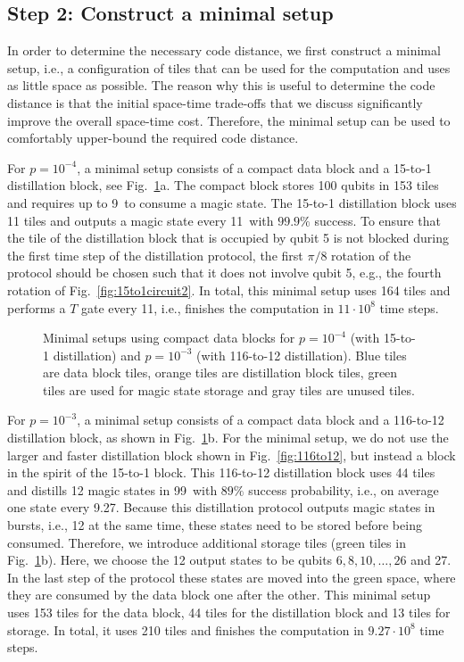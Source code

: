\documentclass[prx,aps,letterpaper,twocolumn,allowfontchageintitle=true,accepted=2019-02-01]{quantumarticle}
\begin{document}
\subsection{Step 2: Construct a minimal setup}

In order to determine the necessary code distance, we first construct a minimal setup, i.e., a configuration of tiles that can be used for the computation and uses as little space as possible. The reason why this is useful to determine the code distance is that the initial space-time trade-offs that we discuss significantly improve the overall space-time cost. Therefore, the minimal setup can be used to comfortably upper-bound the required code distance.

For $p=10^{-4}$, a minimal setup consists of a compact data block and a 15-to-1 distillation block, see Fig.~\ref{fig:minimalsetup1}a. The compact block stores 100 qubits in 153 tiles and requires up to 9\clock \ to consume a magic state. The 15-to-1 distillation block uses 11 tiles and outputs a magic state every 11\clock \ with $99.9\%$ success. To ensure that the tile of the distillation block that is occupied by qubit 5 is not blocked during the first time step of the distillation protocol, the first $\pi/8$ rotation of the protocol should be chosen such that it does not involve qubit 5, e.g., the fourth rotation of Fig.~\ref{fig:15to1circuit2}. In total, this minimal setup uses 164 tiles and performs a $T$ gate every 11\clock, i.e., finishes the computation in $11 \cdot 10^8$ time steps.


\begin{figure}[t!]
\centering
\def\svgwidth{\linewidth}

\caption{Minimal setups using compact data blocks for $p=10^{-4}$ (with 15-to-1 distillation) and $p=10^{-3}$ (with 116-to-12 distillation). Blue tiles are data block tiles, orange tiles are distillation block tiles, green tiles are used for magic state storage and gray tiles are unused tiles.}
\label{fig:minimalsetup1}
\end{figure}

For $p=10^{-3}$, a minimal setup consists of a compact data block and a 116-to-12 distillation block, as shown in Fig.~\ref{fig:minimalsetup1}b. For the minimal setup, we do not use the larger and faster distillation block shown in Fig.~\ref{fig:116to12}, but instead a block in the spirit of the 15-to-1 block. This 116-to-12 distillation block uses  44 tiles and distills 12 magic states in 99\clock \ with $89\%$ success probability, i.e., on average one state every 9.27\clock. Because this distillation protocol outputs magic states in bursts, i.e., 12 at the same time, these states need to be stored before being consumed. Therefore, we introduce additional storage tiles (green tiles in Fig.~\ref{fig:minimalsetup1}b). Here, we choose the 12 output states to be qubits $6,8,10,\dots,26$ and 27. In the last step of the protocol these states are moved into the green space, where they are consumed by the data block one after the other. This minimal setup uses 153 tiles for the data block, 44 tiles for the distillation block and 13 tiles for storage. In total, it uses 210 tiles and finishes the computation in $9.27 \cdot 10^8$ time steps.
\end{document}
